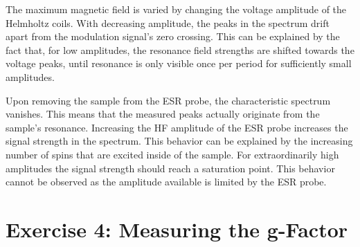 The maximum magnetic field is varied by changing the voltage amplitude of the Helmholtz coils.
With decreasing amplitude, the peaks in the spectrum drift apart from the modulation signal's zero crossing.
This can be explained by the fact that, for low amplitudes, the resonance field strengths are shifted towards the voltage peaks, until resonance is only visible once per period for sufficiently small amplitudes.

Upon removing the sample from the ESR probe, the characteristic spectrum vanishes.
This means that the measured peaks actually originate from the sample's resonance.
Increasing the HF amplitude of the ESR probe increases the signal strength in the spectrum.
This behavior can be explained by the increasing number of spins that are excited inside of the sample.
For extraordinarily high amplitudes the signal strength should reach a saturation point.
This behavior cannot be observed as the amplitude available is limited by the ESR probe.

\section{Exercise 4: Measuring the g-Factor}
